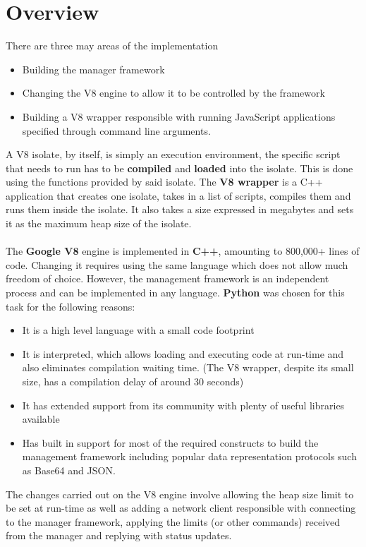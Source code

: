 \documentclass{l4proj}
\begin{document}
\section{Overview}
\hspace*{3em} There are three may areas of the implementation
\begin{itemize}
\item Building the manager framework
\item Changing the V8 engine to allow it to be controlled by the framework
\item Building a V8 wrapper responsible with running JavaScript applications specified through command line arguments.
\end{itemize}
\hspace*{3em} A V8 isolate, by itself, is simply an execution environment, the specific script that needs to run has to be \textbf{compiled} and \textbf{loaded} into the isolate. This is done using the functions provided by said isolate. The \textbf{V8 wrapper} is a C++ application that creates one isolate, takes in a list of scripts, compiles them and runs them inside the isolate. It also takes a size expressed in megabytes and sets it as the maximum heap size of the isolate.
\\\\
\hspace*{3em} The \textbf{Google V8} engine is implemented in \textbf{C++}, amounting to 800,000+ lines of code. Changing it requires using the same language which does not allow much freedom of choice. However, the management framework is an independent process and can be implemented in any language. \textbf{Python} was chosen for this task for the following reasons:
\begin{itemize}
\item It is a high level language with a small code footprint
\item It is interpreted, which allows loading and executing code at run-time and also eliminates compilation waiting time. (The V8 wrapper, despite its small size, has a compilation delay of around 30 seconds)
\item It has extended support from its community with plenty of useful libraries available
\item Has built in support for most of the required constructs to build the management framework including popular data representation protocols such as Base64 and JSON.
\end{itemize}
\hspace*{3em} The changes carried out on the V8 engine involve allowing the heap size limit to be set at run-time as well as adding a network client responsible with connecting to the manager framework, applying the limits (or other commands) received from the manager and replying with status updates.
\end{document}

